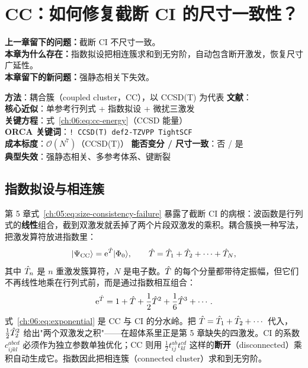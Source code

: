 
\section{CC：如何修复截断 CI 的尺寸一致性？}
\label{ch:06:sec:title}

\begin{problemchain}
\textbf{上一章留下的问题：}截断 CI 不尺寸一致。\\
\textbf{本章为什么存在：}指数拟设把相连簇求和到无穷阶，自动包含断开激发，恢复尺寸广延性。\\
\textbf{本章留下的新问题：}强静态相关下失效。
\end{problemchain}

\begin{methodcard}
\textbf{方法}：耦合簇（coupled cluster，CC），以 CCSD(T) 为代表\quad
\textbf{文献}：\citep{cizek1966,purvis1982,raghavachari1989,bartlett2007cc}\\
\textbf{核心近似}：单参考行列式 + 指数拟设 + 微扰三激发\\
\textbf{关键方程}：式~\eqref{ch:06:eq:cc-energy}（CCSD 能量）\\
\textbf{ORCA 关键词}：\texttt{! CCSD(T) def2-TZVPP TightSCF}\\
\textbf{成本标度}：$\mathcal{O}(N^7)$（CCSD(T)）\quad
\textbf{能否变分 / 尺寸一致}：否 / 是\\
\textbf{典型失效}：强静态相关、多参考体系、键断裂
\end{methodcard}

\subsection{指数拟设与相连簇}
\label{ch:06:sec:ansatz}

第 5 章式~\eqref{ch:05:eq:size-consistency-failure} 暴露了截断 CI 的病根：波函数是行列式的\textbf{线性}组合，截到双激发就丢掉了两个片段双激发的乘积。耦合簇换一种写法，把激发算符放进指数里\citep{cizek1966,bartlett2007cc}：
\begin{equation}
\lvert \Psi_{\mathrm{CC}}\rangle
= \mathrm{e}^{\hat{T}}\lvert \Phi_0\rangle,
\qquad
\hat{T} = \hat{T}_1+\hat{T}_2+\cdots+\hat{T}_N,
\label{ch:06:eq:cc-wavefunction}
\end{equation}
其中 $\hat{T}_n$ 是 $n$ 重激发簇算符，$N$ 是电子数。$\hat{T}$ 的每个分量都带待定振幅，但它们不再线性地乘在行列式前，而是通过指数相互组合：
\begin{equation}
\mathrm{e}^{\hat{T}}
= 1 + \hat{T} + \frac{1}{2}\hat{T}^2 + \frac{1}{6}\hat{T}^3 + \cdots .
\label{ch:06:eq:exponential}
\end{equation}
式~\eqref{ch:06:eq:exponential} 是 CC 与 CI 的分水岭。把 $\hat{T}=\hat{T}_1+\hat{T}_2+\cdots$ 代入，$\frac12\hat{T}_2^2$ 给出"两个双激发之积"——在超体系里正是第 5 章缺失的四激发。CI 的系数 $c_{ijkl}^{abcd}$ 必须作为独立参数单独优化；CC 则用 $\frac12 t_{ij}^{ab}t_{kl}^{cd}$ 这样的\textbf{断开}（disconnected）乘积自动生成它。指数因此把相连簇（connected cluster）求和到无穷阶。

